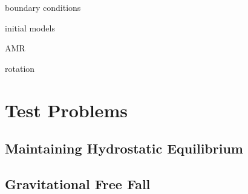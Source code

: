 \documentclass[12pt,preprint]{aastex}
\begin{document}
boundary conditions

initial models

AMR

rotation


\section{Test Problems}\label{Sec:Tests}

\subsection{Maintaining Hydrostatic Equilibrium}\label{Sec:HSE}

\subsection{Gravitational Free Fall}\label{Sec:Gravitational Free Fall}
\end{document}

